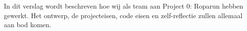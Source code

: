\documentclass[../main.tex]{subfiles}
\begin{document}
    In dit verslag wordt beschreven hoe wij als team aan Project 0: Roparun hebben gewerkt.
    Het ontwerp, de projecteisen, code eisen en zelf-reflectie zullen allemaal aan bod komen.
\end{document}
